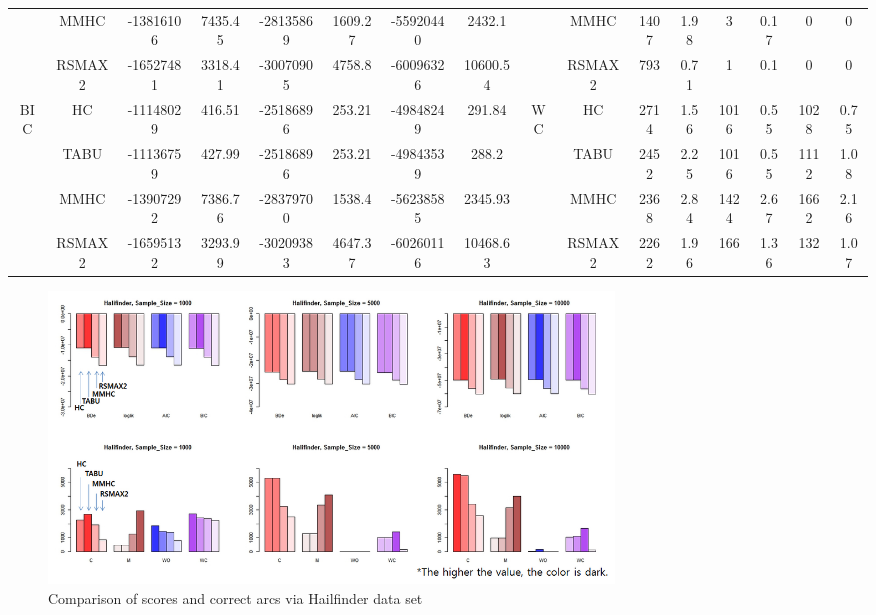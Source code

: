 \begin{table}[p]
{\begin{tabular}{cc||cc|cc|cc||cc|cc|cc|cc}
& MMHC &	-13816106 & 	7435.45 & 	-28135869 & 	1609.27 & 	-55920440 & 	2432.1 & 	& MMHC &	1407 & 	1.98 & 	3 & 	0.17 & 	0 & 	0\tabularnewline													
& RSMAX2 &	-16527481 & 	3318.41 & 	-30070905 & 	4758.8 & 	-60096326 & 	10600.54 & 	& RSMAX2 &	793 & 	0.71 & 	1 & 	0.1 & 	0 & 	0\tabularnewline													
\hline																										
\multirow{4}{*}{BIC} & HC &	-11148029 & 	416.51 & 	-25186896 & 	253.21 & 	-49848249 & 	291.84 & 	\multirow{4}{*}{WC} & HC &	2714 & 	1.56 & 	1016 & 	0.55 & 	1028 & 	0.75\tabularnewline													
& TABU &	-11136759 & 	427.99 & 	-25186896 & 	253.21 & 	-49843539 & 	288.2 & 	& TABU &	2452 & 	2.25 & 	1016 & 	0.55 & 	1112 & 	1.08\tabularnewline													
& MMHC &	-13907292 & 	7386.76 & 	-28379700 & 	1538.4 & 	-56238585 & 	2345.93 & 	& MMHC &	2368 & 	2.84 & 	1424 & 	2.67 & 	1662 & 	2.16\tabularnewline													
& RSMAX2 &	-16595132 & 	3293.99 & 	-30209383 & 	4647.37 & 	-60260116 & 	10468.63 & 	& RSMAX2 &	2262 & 	1.96 & 	166 & 	1.36 & 	132 & 	1.07\tabularnewline													
\hline																										
\end{tabular}																										
}																										
\end{table}

	\begin{figure}[p]
	\centering
		\includegraphics[height=220pt]{Real_4_Halifinder}
		\caption{Comparison of scores and correct arcs via Hailfinder data set}
	\end{figure}	